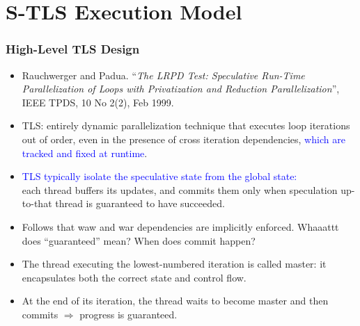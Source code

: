 \documentclass{beamer}
\newcommand{\blue}[1]{\textcolor{Blue}{{#1}}}
\newcommand{\emp}[1]{\textcolor{DikuRed}{ #1}}
\newcommand{\emphh}[1]{\textcolor{CosGreen}{ #1}}
\begin{document}
\section{S-TLS Execution Model}

\begin{frame}[fragile]
	\tableofcontents[currentsection]
\end{frame}


\begin{frame}[fragile,t]
  \frametitle{High-Level TLS Design}

\begin{itemize}
\item Rauchwerger and Padua. ``{\em The LRPD Test: Speculative Run-Time 
        Parallelization of Loops with Privatization and 
        Reduction Parallelization}'', 
        IEEE TPDS, 10 No 2(2), Feb 1999.\medskip

\item TLS: entirely dynamic parallelization technique that executes
        loop iterations out of order, even in the
        presence of cross iteration dependencies, \blue{which are tracked
        and fixed at runtime}.\medskip

\item \blue{TLS typically isolate the speculative state from the global state:}\\
        each thread buffers its updates, and \emp{commits} them only when 
        speculation up-to-that thread is \emp{guaranteed} to have succeeded.

\item \emphh{Follows that {\sc waw} and {\sc war} dependencies are 
                implicitly enforced.}
        \emp{Whaaattt does ``guaranteed'' mean? When does commit happen?}\medskip\pause

\item The thread executing the lowest-numbered iteration is called \emphh{\sc master}:
        it encapsulates both the correct state and control flow.\medskip

\item At the end of its iteration, the thread waits to become {\sc master}
        and then commits $\Rightarrow$ progress is guaranteed.
\end{itemize}

\end{frame}
\end{document}
